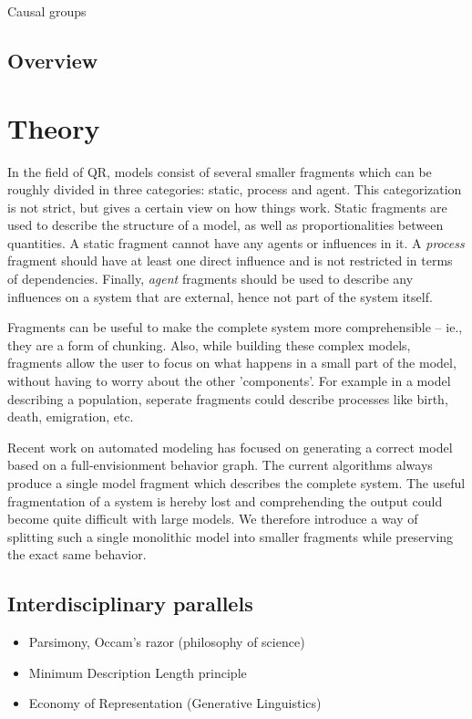 \documentclass{article} %
\begin{document}
Causal groups %

\subsection{Overview}


\section{Theory}

In the field of QR, models %
consist of several smaller fragments which can be roughly divided in three
categories: static, process and agent. This categorization is not strict, but
gives a certain view on how things work. Static fragments are used to describe
the structure of a model, as well as proportionalities between quantities. A
static fragment cannot have any agents or influences in it. A \emph{process}
fragment should have at least one direct influence and is not restricted in
terms of dependencies. %
Finally, \emph{agent} fragments should be used to describe any influences on a
system that are external, hence not part of the system itself.

Fragments can be useful to make the complete system more comprehensible --
ie., they are a form of chunking.  Also, while building these complex models,
fragments allow the user to focus on what happens in a small part of the
model, without having to worry about the other 'components'. For example in a
model describing a population, seperate fragments could describe processes
like birth, death, emigration, etc.

Recent work on automated modeling \cite{buisman, liem, vanweelden} has focused
on generating a correct model based on a full-envisionment behavior graph. The
current algorithms always produce a single model fragment which describes the
complete system. The useful fragmentation of a system is hereby lost and
comprehending the output could become quite difficult with large models. We
therefore introduce a way of splitting such a single monolithic model into
smaller fragments while preserving the exact same behavior.

\subsection{Interdisciplinary parallels}

\begin{itemize}

\item Parsimony, Occam's razor (philosophy of science)

\item Minimum Description Length principle %

\item Economy of Representation (Generative Linguistics)

\end{itemize}
\end{document}

